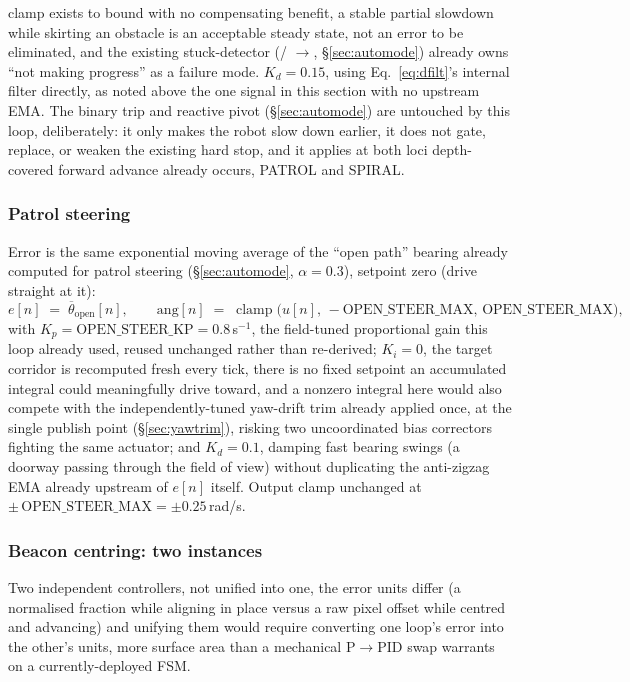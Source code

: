 clamp exists to bound with no compensating benefit, a stable partial
slowdown while skirting an obstacle is an acceptable steady state, not an
error to be eliminated, and the existing stuck-detector
(/
$\to$, \S\ref{sec:automode}) already owns ``not
making progress'' as a failure mode. $K_d = 0.15$, using
Eq.~\ref{eq:dfilt}'s internal filter directly, as noted above the one
signal in this section with no upstream EMA. The binary trip and reactive
pivot (\S\ref{sec:automode}) are untouched by this loop, deliberately: it
only makes the robot slow down earlier, it does not gate, replace, or
weaken the existing hard stop, and it applies at both loci depth-covered
forward advance already occurs, PATROL and SPIRAL.

\subsubsection{Patrol steering}
Error is the same exponential moving average of the ``open path'' bearing
already computed for patrol steering (\S\ref{sec:automode}, $\alpha=0.3$),
setpoint zero (drive straight at it):
\begin{equation}
e[n] \;=\; \overline{\theta}_{\text{open}}[n], \qquad \text{ang}[n] \;=\; \operatorname{clamp}\!\big(u[n],\, -\text{OPEN\_STEER\_MAX},\, \text{OPEN\_STEER\_MAX}\big),
\label{eq:patrolerr}
\end{equation}
with $K_p = \text{OPEN\_STEER\_KP} = 0.8$\,s$^{-1}$, the field-tuned
proportional gain this loop already used, reused unchanged rather than
re-derived; $K_i = 0$, the target corridor is recomputed fresh every
tick, there is no fixed setpoint an accumulated integral could
meaningfully drive toward, and a nonzero integral here would also compete
with the independently-tuned yaw-drift trim already applied once, at the
single publish point (\S\ref{sec:yawtrim}), risking two uncoordinated bias
correctors fighting the same actuator; and $K_d = 0.1$, damping fast
bearing swings (a doorway passing through the field of view) without
duplicating the anti-zigzag EMA already upstream of $e[n]$ itself. Output
clamp unchanged at $\pm\,\text{OPEN\_STEER\_MAX} = \pm 0.25$\,rad/s.

\subsubsection{Beacon centring: two instances}
Two independent controllers, not unified into one, the error units differ
(a normalised fraction while aligning in place versus a raw pixel offset
while centred and advancing) and unifying them would require converting
one loop's error into the other's units, more surface area than a
mechanical P$\to$PID swap warrants on a currently-deployed FSM.

